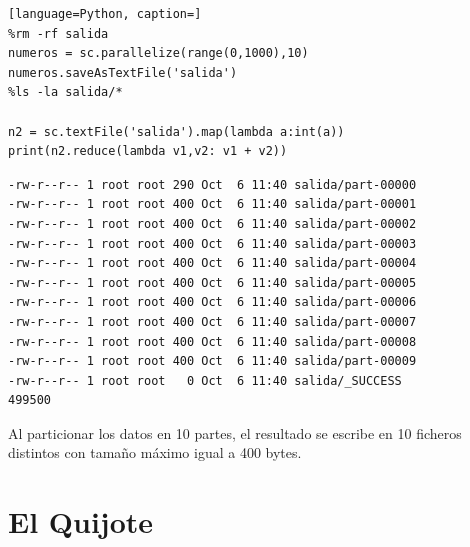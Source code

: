 \documentclass[10pt,swedish, openany]{book}
\begin{document}
\begin{lstlisting}[language=Python, caption=]
%rm -rf salida
numeros = sc.parallelize(range(0,1000),10)
numeros.saveAsTextFile('salida')
%ls -la salida/*

n2 = sc.textFile('salida').map(lambda a:int(a))
print(n2.reduce(lambda v1,v2: v1 + v2))
\end{lstlisting}
\begin{verbatim}
-rw-r--r-- 1 root root 290 Oct  6 11:40 salida/part-00000
-rw-r--r-- 1 root root 400 Oct  6 11:40 salida/part-00001
-rw-r--r-- 1 root root 400 Oct  6 11:40 salida/part-00002
-rw-r--r-- 1 root root 400 Oct  6 11:40 salida/part-00003
-rw-r--r-- 1 root root 400 Oct  6 11:40 salida/part-00004
-rw-r--r-- 1 root root 400 Oct  6 11:40 salida/part-00005
-rw-r--r-- 1 root root 400 Oct  6 11:40 salida/part-00006
-rw-r--r-- 1 root root 400 Oct  6 11:40 salida/part-00007
-rw-r--r-- 1 root root 400 Oct  6 11:40 salida/part-00008
-rw-r--r-- 1 root root 400 Oct  6 11:40 salida/part-00009
-rw-r--r-- 1 root root   0 Oct  6 11:40 salida/_SUCCESS
499500
\end{verbatim}

Al particionar los datos en 10 partes, el resultado se escribe en 10 ficheros distintos con tamaño máximo igual a 400 bytes.

\section{El Quijote}
\end{document}
